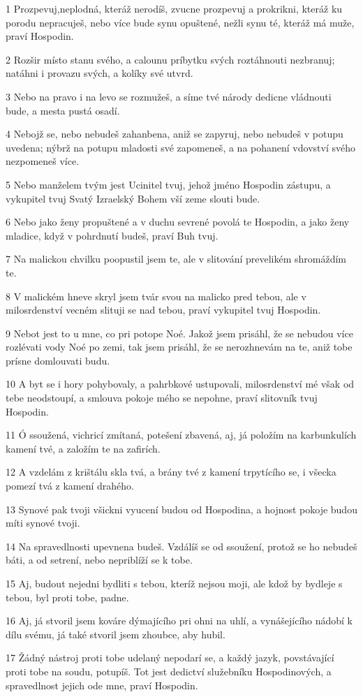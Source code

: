 \par 1 Prozpevuj,neplodná, kteráž nerodíš, zvucne prozpevuj a prokrikni, kteráž ku porodu nepracuješ, nebo více bude synu opuštené, nežli synu té, kteráž má muže, praví Hospodin.
\par 2 Rozšir místo stanu svého, a calounu príbytku svých roztáhnouti nezbranuj; natáhni i provazu svých, a kolíky své utvrd.
\par 3 Nebo na pravo i na levo se rozmužeš, a síme tvé národy dedicne vládnouti bude, a mesta pustá osadí.
\par 4 Nebojž se, nebo nebudeš zahanbena, aniž se zapyruj, nebo nebudeš v potupu uvedena; nýbrž na potupu mladosti své zapomeneš, a na pohanení vdovství svého nezpomeneš více.
\par 5 Nebo manželem tvým jest Ucinitel tvuj, jehož jméno Hospodin zástupu, a vykupitel tvuj Svatý Izraelský Bohem vší zeme slouti bude.
\par 6 Nebo jako ženy propuštené a v duchu sevrené povolá te Hospodin, a jako ženy mladice, když v pohrdnutí budeš, praví Buh tvuj.
\par 7 Na malickou chvilku poopustil jsem te, ale v slitování prevelikém shromáždím te.
\par 8 V malickém hneve skryl jsem tvár svou na malicko pred tebou, ale v milosrdenství vecném slituji se nad tebou, praví vykupitel tvuj Hospodin.
\par 9 Nebot jest to u mne, co pri potope Noé. Jakož jsem prisáhl, že se nebudou více rozlévati vody Noé po zemi, tak jsem prisáhl, že se nerozhnevám na te, aniž tobe prísne domlouvati budu.
\par 10 A byt se i hory pohybovaly, a pahrbkové ustupovali, milosrdenství mé však od tebe neodstoupí, a smlouva pokoje mého se nepohne, praví slitovník tvuj Hospodin.
\par 11 Ó ssoužená, vichricí zmítaná, potešení zbavená, aj, já položím na karbunkulích kamení tvé, a založím te na zafirích.
\par 12 A vzdelám z krištálu skla tvá, a brány tvé z kamení trpytícího se, i všecka pomezí tvá z kamení drahého.
\par 13 Synové pak tvoji všickni vyucení budou od Hospodina, a hojnost pokoje budou míti synové tvoji.
\par 14 Na spravedlnosti upevnena budeš. Vzdálíš se od ssoužení, protož se ho nebudeš báti, a od setrení, nebo nepriblíží se k tobe.
\par 15 Aj, budout nejedni bydliti s tebou, kteríž nejsou moji, ale kdož by bydleje s tebou, byl proti tobe, padne.
\par 16 Aj, já stvoril jsem kováre dýmajícího pri ohni na uhlí, a vynášejícího nádobí k dílu svému, já také stvoril jsem zhoubce, aby hubil.
\par 17 Žádný nástroj proti tobe udelaný nepodarí se, a každý jazyk, povstávající proti tobe na soudu, potupíš. Tot jest dedictví služebníku Hospodinových, a spravedlnost jejich ode mne, praví Hospodin.

